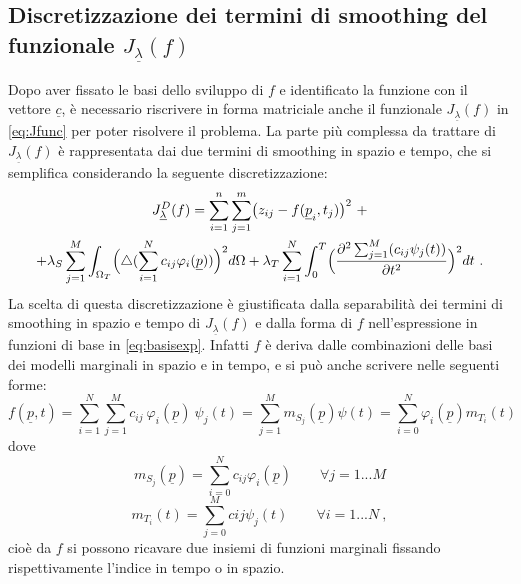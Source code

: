 \documentclass[a4paper,11pt,twoside,openright]{book}							%
\begin{document}
\subsection*{Discretizzazione dei termini di smoothing del funzionale $J_{\underline \lambda }(f)$}
Dopo aver fissato le basi dello sviluppo di $f$ e identificato la funzione con il vettore $\underline c$, è necessario riscrivere in forma matriciale anche il funzionale $J_{\underline \lambda }(f)$ in \ref{eq:Jfunc} per poter risolvere il problema. La parte più complessa da trattare di $J_{\underline \lambda }(f)$ è rappresentata dai due termini di smoothing in spazio e tempo, che si semplifica considerando la seguente discretizzazione:
\begin{multline}
\label{eq:penalizzdisc}
J_{\underline \lambda }^D(f)=\sum_{i=1}^n \sum_{j=1}^m \bigl( z_{ij} - f(\underline p_i,t_j) \bigr)^2 \ + \\
+\lambda_S  \sum_{j=1}^M \int_{\Omega_T} \Bigl( \triangle(\sum_{i=1}^N  c_{ij}\varphi_i (\underline p)) \Bigr)^2 d \Omega + \lambda_T \sum_{i=1}^N\int_0^T \Bigl( \frac{\partial^2 \sum_{j=1}^M(c_{ij}\psi_j(t)) }{\partial t ^2} \Bigr)^2 dt \ .
\end{multline}
La scelta di questa discretizzazione è giustificata dalla separabilità dei termini di smoothing in spazio e tempo di $J_{\underline \lambda }(f)$ e dalla forma di $f$ nell'espressione in funzioni di base in \ref{eq:basisexp}. Infatti $f$ è deriva dalle combinazioni delle basi dei modelli marginali in spazio e in tempo, e si può anche scrivere nelle seguenti forme:
$$
f(\underline p,t)=\sum_{i=1}^N \sum_{j=1}^M c_{ij}\ \varphi_i(\underline p)\ \psi_j(t)=\sum_{j=1}^Mm_{S_j}(\underline p)\psi(t)=\sum_{i=0}^N\varphi_i(\underline p)m_{T_i}(t)
$$
dove
$$
m_{S_j}(\underline p)=\sum_{i=0}^Nc_{ij}\varphi_i(\underline p) \qquad \forall j=1...M
$$
$$
m_{T_i}(t)=\sum_{j=0}^Mc{ij}\psi_j(t) \qquad \forall i=1...N \ ,
$$
cioè da $f$ si possono ricavare due insiemi di funzioni marginali fissando rispettivamente l'indice in tempo o in spazio.
\end{document}
